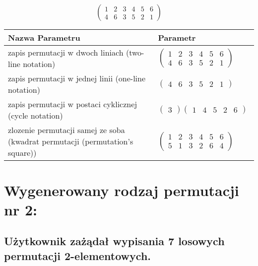 \documentclass[12pt]{article}
\begin{document}
\subsection{}
\begin{center}
\[
\begin{pmatrix}
	1 & 2 & 3 & 4 & 5 & 6 \\ 
	4 & 6 & 3 & 5 & 2 & 1 
\end{pmatrix}
\]

\begin{tabular}{|m{0.6\linewidth}|m{0.4\linewidth}|}
	\hline
	Nazwa Parametru & Parametr \\
	\hline
	zapis permutacji w dwoch liniach (two-line notation) & $\begin{pmatrix} 1 & 2 & 3 & 4 & 5 & 6 \\ 
4 & 6 & 3 & 5 & 2 & 1 \end{pmatrix}$ \\ 
	\hline
	zapis permutacji w jednej linii (one-line notation) & $\begin{pmatrix} 4 & 6 & 3 & 5 & 2 & 1 \end{pmatrix}$ \\ 
	\hline
	zapis permutacji w postaci cyklicznej (cycle notation) & $\begin{pmatrix} 3 \end{pmatrix} \begin{pmatrix} 1 & 4 & 5 & 2 & 6 \end{pmatrix} $ \\ 
	\hline
	zlozenie permutacji samej ze soba (kwadrat permutacji (permutation's square)) & $\begin{pmatrix} 1 & 2 & 3 & 4 & 5 & 6 \\ 
5 & 1 & 3 & 2 & 6 & 4 \end{pmatrix}$ \\ 
	\hline
\end{tabular}
\end{center}


\section{Wygenerowany rodzaj permutacji nr 2:}
\subsection*{Użytkownik zażądał wypisania 7 losowych permutacji 2-elementowych.}
\end{document}
